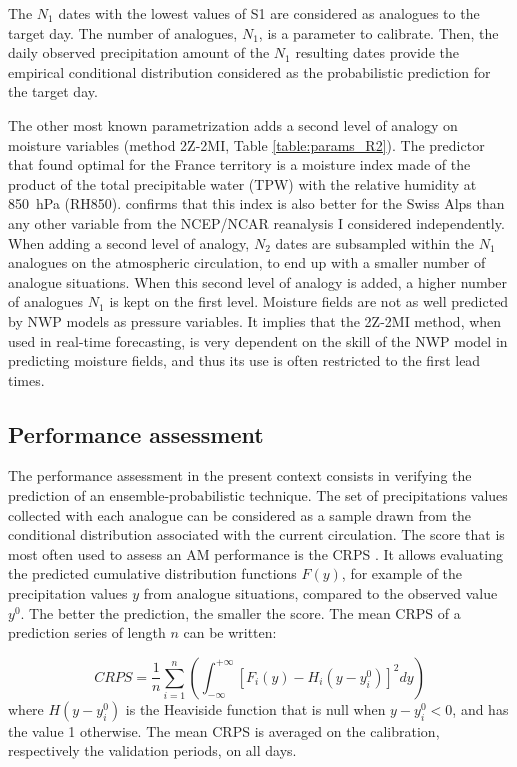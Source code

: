 \documentclass[review]{elsarticle}
\begin{document}
The $N_{1}$ dates with the lowest values of S1 are considered as analogues to the target day. The number of analogues, $N_{1}$, is a parameter to calibrate. Then, the daily observed precipitation amount of the $N_{1}$ resulting dates provide the empirical conditional distribution considered as the probabilistic prediction for the target day.

The other most known parametrization adds a second level of analogy on moisture variables (method 2Z-2MI, Table \ref{table:params_R2}). The predictor that \citet{Bontron2004} found optimal for the France territory is a moisture index made of the product of the total precipitable water (TPW) with the relative humidity at 850~hPa (RH850). \cite{Horton2012a} confirms that this index is also better for the Swiss Alps than any other variable from the NCEP/NCAR reanalysis I considered independently. When adding a second level of analogy, $N_{2}$ dates are subsampled within the $N_{1}$ analogues on the atmospheric circulation, to end up with a smaller number of analogue situations. When this second level of analogy is added, a higher number of analogues $N_{1}$ is kept on the first level. Moisture fields are not as well predicted by NWP models as pressure variables. It implies that the 2Z-2MI method, when used in real-time forecasting, is very dependent on the skill of the NWP model in predicting moisture fields, and thus its use is often restricted to the first lead times.


\subsection{Performance assessment}
\label{sec:score}

The performance assessment in the present context consists in verifying the prediction of an ensemble-probabilistic technique. The set of precipitations values collected with each analogue can be considered as a sample drawn from the conditional distribution associated with the current circulation. The score that is most often used to assess an AM performance is the CRPS \citep[Continuous Ranked Probability Score,][]{Brown1974, Matheson1976, Hersbach2000}. It allows evaluating the predicted cumulative distribution functions $F(y)$, for example of the precipitation values $y$ from analogue situations, compared to the observed value $y^{0}$. The better the prediction, the smaller the score. The mean CRPS of a prediction series of length $n$ can be written:

\begin{equation}
\label{eq:CRPS}
CRPS = \frac{1}{n} \sum_{i=1}^{n} \left(  \int_{-\infty}^{+\infty} \left[ F_{i}(y)-H_{i}(y-y_{i}^{0})\right]^{2} dy \right) 
\end{equation}
where $H(y-y_{i}^{0})$ is the Heaviside function that is null when $y-y_{i}^{0}<0$, and has the value 1 otherwise. The mean CRPS is averaged on the calibration, respectively the validation periods, on all days.
\end{document}
